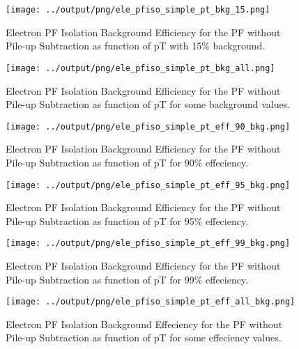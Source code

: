 \documentclass[11pt]{book}
\begin{document}
\begin{figure}[htb]
\centering
\texttt{[image: ../output/png/ele\_pfiso\_simple\_pt\_bkg\_15.png]}
\caption{Electron PF Isolation Background Efficiency for the PF without Pile-up Subtraction as function of pT with 15\% background.}
\label{fig:ele_pfiso_pt_bkg_simple_bkg_15}
\end{figure}

\begin{figure}[htb]
\centering
\texttt{[image: ../output/png/ele\_pfiso\_simple\_pt\_bkg\_all.png]}
\caption{Electron PF Isolation Background Efficiency for the PF without Pile-up Subtraction as function of pT for some background values.}
\label{fig:ele_pfiso_pt_bkg_simple_bkg_all}
\end{figure}

\begin{figure}[htb]
\centering
\texttt{[image: ../output/png/ele\_pfiso\_simple\_pt\_eff\_90\_bkg.png]}
\caption{Electron PF Isolation Background Efficiency for the PF without Pile-up Subtraction as function of pT for 90\% effeciency.}
\label{fig:ele_pfiso_pt_eff_simple_eff_90_bkg}
\end{figure}

\begin{figure}[htb]
\centering
\texttt{[image: ../output/png/ele\_pfiso\_simple\_pt\_eff\_95\_bkg.png]}
\caption{Electron PF Isolation Background Efficiency for the PF without Pile-up Subtraction as function of pT for 95\% effeciency.}
\label{fig:ele_pfiso_pt_eff_simple_eff_95_bkg}
\end{figure}

\begin{figure}[htb]
\centering
\texttt{[image: ../output/png/ele\_pfiso\_simple\_pt\_eff\_99\_bkg.png]}
\caption{Electron PF Isolation Background Efficiency for the PF without Pile-up Subtraction as function of pT for 99\% effeciency.}
\label{fig:ele_pfiso_pt_eff_simple_eff_99_bkg}
\end{figure}

\begin{figure}[htb]
\centering
\texttt{[image: ../output/png/ele\_pfiso\_simple\_pt\_eff\_all\_bkg.png]}
\caption{Electron PF Isolation Background Effeciency for the PF without Pile-up Subtraction as function of pT for some effeciency values.}
\label{fig:ele_pfiso_pt_eff_simple_eff_all_bkg}
\end{figure}
\clearpage
\end{document}
